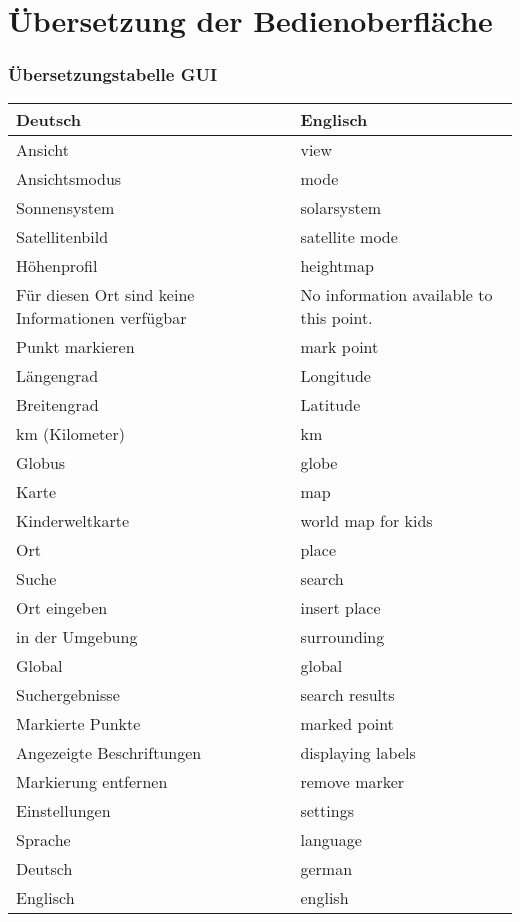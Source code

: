\documentclass[10pt]{scrreprt}
\begin{document}
\chapter{Übersetzung der Bedienoberfläche}

\subsection{Übersetzungstabelle GUI}
\begin{tabular}{|p{7.5cm}|p{7.5cm}|}
\hline 
\textbf{Deutsch} & \textbf{Englisch} \\ 
\hline
\hline 
Ansicht & view \\ 
\hline
Ansichtsmodus & mode \\ 
\hline
Sonnensystem & solarsystem \\
\hline
Satellitenbild & satellite mode \\
\hline
Höhenprofil & heightmap \\
\hline
Für diesen Ort sind keine Informationen verfügbar & No information available to this point. \\
\hline
Punkt markieren & mark point\\
\hline
Längengrad & Longitude \\
\hline
Breitengrad & Latitude \\
\hline
km (Kilometer) & km \\
\hline
Globus & globe \\
\hline
Karte & map \\
\hline
Kinderweltkarte & world map for kids \\
\hline
Ort & place \\
\hline
Suche & search \\
\hline
Ort eingeben & insert place \\
\hline
in der Umgebung & surrounding \\
\hline
Global & global \\
\hline
Suchergebnisse & search results \\
\hline
Markierte Punkte & marked point \\
\hline
Angezeigte Beschriftungen & displaying labels \\
\hline
Markierung entfernen & remove marker \\
\hline
Einstellungen & settings \\
\hline
Sprache & language \\
\hline
Deutsch & german \\
\hline
Englisch & english \\

\end{tabular}
\end{document}
